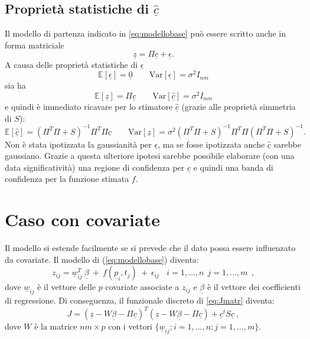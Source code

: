 \documentclass[a4paper,11pt,twoside,openright]{book}							%
\begin{document}
\subsection*{Proprietà statistiche di $\hat  {\underline c}$}
Il modello di partenza indicato in \ref{eq:modellobase} può essere scritto anche in forma matriciale
\begin{equation}
\label{eq:modellobasematric}
\underline z=\Pi \underline c + \underline \epsilon .
\end{equation}
A causa delle proprietà statistiche di $\underline \epsilon$
$$
\mathbb{E}[\underline \epsilon] = \underline 0 \qquad \mathrm{Var}[\underline \epsilon] = \sigma^2 I_{nm}
$$
sia ha
$$
\mathbb{E}[\underline z] = \Pi \underline c \qquad \mathrm{Var}[\hat  {\underline c}] = \sigma^2 I_{nm}
$$
e quindi è immediato ricavare per lo stimatore $\hat  {\underline c}$ (grazie alle proprietà simmetria di $S$):
$$
\mathbb{E}[\hat  {\underline c}] = (\Pi^T \Pi + S)^{-1}\Pi^T\Pi \underline c \qquad \mathrm{Var}[\underline z] = \sigma^2 (\Pi^T \Pi + S)^{-1}\Pi^T\Pi(\Pi^T \Pi + S)^{-1} .
$$
Non è stata ipotizzata la gaussianità per $\underline \epsilon$, ma se fosse ipotizzata anche $\hat  {\underline c}$ sarebbe gaussiano. Grazie a questa ulteriore ipotesi sarebbe possibile elaborare (con una data significatività) una regione di confidenza per $\hat  {\underline c}$ e quindi una banda di confidenza per la funzione stimata $f$.


\section{Caso con covariate}

Il modello si estende facilmente se si prevede che il dato possa essere influenzato da covariate. Il modello di (\ref{eq:modellobase}) diventa:
\begin{equation}
\label{eq:modellobasecovar}
z_{ij}= \underline w_{ij}^T\  \underline \beta   \ + \  f(\underline p_i,t_j)\ +\ \epsilon_{ij}\ \ \ \ i = 1,...,n\ \ j=1,...,m \ \ ,
\end{equation}
dove $\underline w_{ij}$ è il vettore delle $p$ covariate associate a $z_{ij}$ e $\underline \beta$ è il vettore dei coefficienti di regressione. Di conseguenza, il funzionale discreto di \ref{eq:Jmatr} diventa:
$$ J = (\underline z - W \underline \beta - \Pi \underline c)^T (\underline z - W \underline \beta - \Pi \underline c) + \underline c^t S \underline c  \ ,$$
dove $W$ è la matrice $nm \times p$ con i vettori $ \{\underline w_{ij}; i=1,...,n;j=1,...,m\}$.
\end{document}
